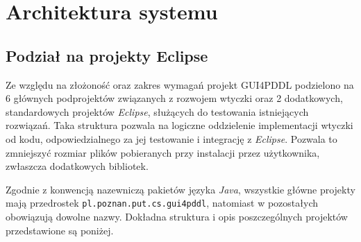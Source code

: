 \chapter{Architektura systemu}
\section{Podział na projekty Eclipse}

Ze względu na złożoność oraz zakres wymagań projekt GUI4PDDL podzielono na 6 głównych podprojektów związanych z rozwojem wtyczki oraz 2 dodatkowych, standardowych projektów \textit{Eclipse}, służących do testowania istniejących rozwiązań. Taka struktura pozwala na logiczne oddzielenie implementacji wtyczki od kodu, odpowiedzialnego za jej testowanie i integrację z \emph{Eclipse}. Pozwala to zmniejszyć rozmiar plików pobieranych przy instalacji przez użytkownika, zwłaszcza dodatkowych bibliotek.

Zgodnie z konwencją nazewniczą pakietów języka \textit{Java}, wszystkie główne projekty mają przedrostek \texttt{pl.poznan.put.cs.gui4pddl}, natomiast w pozostałych obowiązują dowolne nazwy. Dokładna struktura i opis poszczególnych projektów przedstawione są poniżej.

